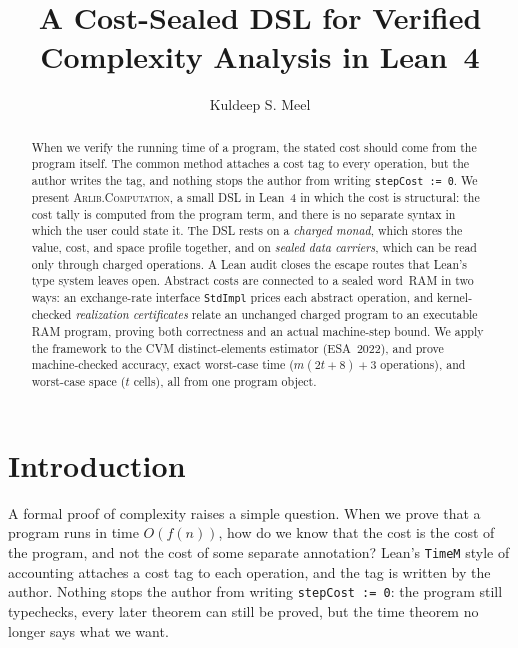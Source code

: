 \documentclass[acmsmall,nonacm]{acmart}
\begin{document}
\title{A Cost-Sealed DSL for Verified Complexity Analysis in Lean~4}

\author{Kuldeep S. Meel}

\begin{abstract}
When we verify the running time of a program, the stated cost should come from the program itself.
The common method attaches a cost tag to every operation, but the author writes the tag, and nothing stops the author from writing \lstinline{stepCost := 0}.
We present \textsc{Arlib.Computation}, a small DSL in Lean~4 in which the cost is structural: the cost tally is computed from the program term, and there is no separate syntax in which the user could state it.
The DSL rests on a \emph{charged monad}, which stores the value, cost, and space profile together, and on \emph{sealed data carriers}, which can be read only through charged operations.
A Lean audit closes the escape routes that Lean's type system leaves open.
Abstract costs are connected to a sealed word~RAM in two ways: an exchange-rate interface \lstinline{StdImpl} prices each abstract operation, and kernel-checked \emph{realization certificates} relate an unchanged charged program to an executable RAM program, proving both correctness and an actual machine-step bound.
We apply the framework to the CVM distinct-elements estimator (ESA~2022), and prove machine-checked accuracy, exact worst-case time ($m(2t+8)+3$ operations), and worst-case space ($t$ cells), all from one program object.
\end{abstract}

\maketitle

\section{Introduction}\label{sec:intro}

A formal proof of complexity raises a simple question.
When we prove that a program runs in time $O(f(n))$, how do we know that the cost is the cost of the program, and not the cost of some separate annotation?
Lean's \lstinline{TimeM} style of accounting attaches a cost tag to each operation, and the tag is written by the author.
Nothing stops the author from writing \lstinline{stepCost := 0}: the program still typechecks, every later theorem can still be proved, but the time theorem no longer says what we want.
\end{document}
